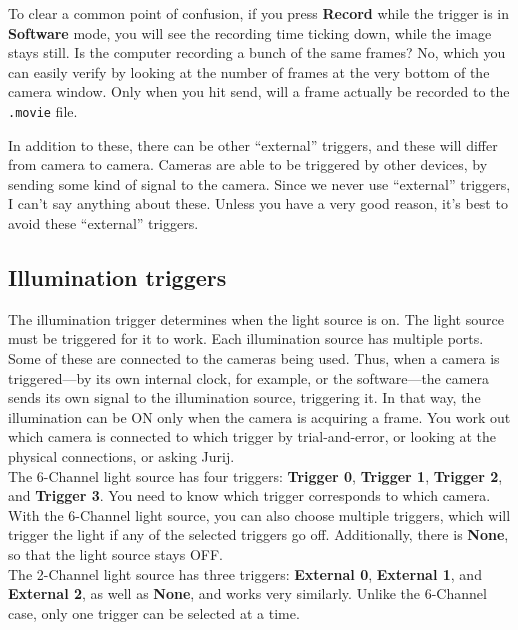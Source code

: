 \documentclass{report}
\begin{document}
To clear a common point of confusion, if you press \textbf{Record} while the trigger is in \textbf{Software} mode, you will see the recording time ticking down, while the image stays still. Is the computer recording a bunch of the same frames? No, which you can easily verify by looking at the number of frames at the very bottom of the camera window. Only when you hit send, will a frame actually be recorded to the \verb|.movie| file.

In addition to these, there can  be other ``external'' triggers, and these will differ from camera to camera. Cameras are able to be triggered by other devices, by sending some kind of signal to the camera. Since we never use ``external'' triggers, I can't say anything about these. Unless you have a very good reason, it's best to avoid these ``external'' triggers.\\

\subsection{Illumination triggers}

The illumination trigger determines when the light source is on. The light source must be triggered for it to work. Each illumination source has multiple ports. Some of these are connected to the cameras being used. Thus, when a camera is triggered---by its own internal clock, for example, or the software---the camera sends its own signal to the illumination source, triggering it. In that way, the illumination can be ON only when the camera is acquiring a frame. You work out which camera is connected to which trigger  by trial-and-error, or looking at the physical connections, or asking Jurij. \\

The 6-Channel light source has four triggers: \textbf{Trigger 0}, \textbf{Trigger 1}, \textbf{Trigger 2}, and \textbf{Trigger 3}. You need to know which trigger corresponds to which camera. With the 6-Channel light source, you can also choose multiple triggers, which will trigger the light if any of the selected triggers go off. Additionally, there is \textbf{None}, so that the light source stays OFF.\\

The 2-Channel light source has three triggers: \textbf{External 0}, \textbf{External 1}, and \textbf{External 2}, as well as \textbf{None}, and works very similarly. Unlike the 6-Channel case, only one trigger can be selected at a time.
\end{document}
